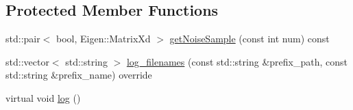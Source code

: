 \subsection*{Protected Member Functions}
\begin{DoxyCompactItemize}
\item 
std\+::pair$<$ bool, Eigen\+::\+Matrix\+Xd $>$ \mbox{\hyperlink{classbfl_1_1LinearModel_af248dfa32cd9145d87e84ddade6316ad}{get\+Noise\+Sample}} (const int num) const
\item 
std\+::vector$<$ std\+::string $>$ \mbox{\hyperlink{classbfl_1_1LinearModel_a8b8f645a7b7d8ebbb02c8958428fcf10}{log\+\_\+filenames}} (const std\+::string \&prefix\+\_\+path, const std\+::string \&prefix\+\_\+name) override
\item 
virtual void \mbox{\hyperlink{classbfl_1_1Logger_ad44f46593cb8c4c87c1178eb326e2f64}{log}} ()
\end{DoxyCompactItemize}
